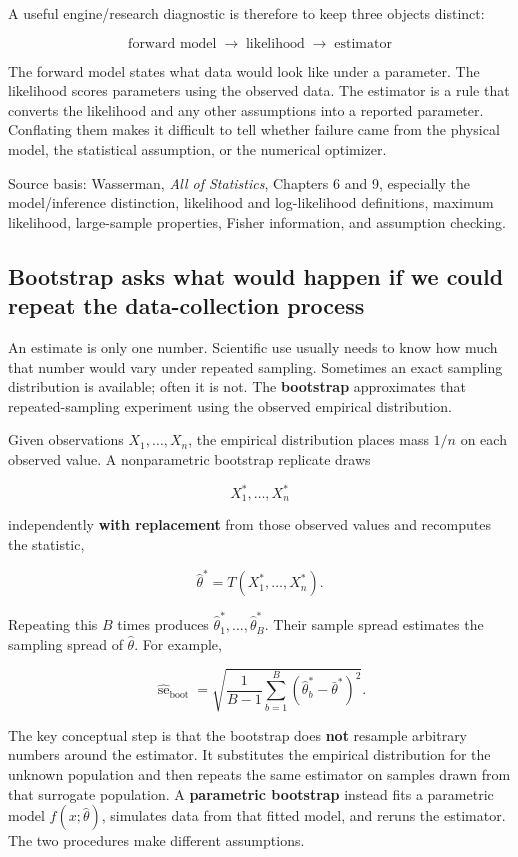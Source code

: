 A useful engine/research diagnostic is therefore to keep three objects distinct:

\[
\boxed{
\text{forward model}
\;\longrightarrow\;
\text{likelihood}
\;\longrightarrow\;
\text{estimator}
}
\]

The forward model states what data would look like under a parameter. The likelihood scores parameters using the observed data. The estimator is a rule that converts the likelihood and any other assumptions into a reported parameter. Conflating them makes it difficult to tell whether failure came from the physical model, the statistical assumption, or the numerical optimizer.

Source basis: Wasserman, \emph{All of Statistics}, Chapters 6 and 9, especially the model/inference distinction, likelihood and log-likelihood definitions, maximum likelihood, large-sample properties, Fisher information, and assumption checking.

\subsection{Bootstrap asks what would happen if we could repeat the data-collection process}\label{02-foundations-ii-ch030-bootstrap-asks-what-would-happen-if-we-could-repeat-the-data-collection-process}

An estimate is only one number. Scientific use usually needs to know how much that number would vary under repeated sampling. Sometimes an exact sampling distribution is available; often it is not. The \textbf{bootstrap} approximates that repeated-sampling experiment using the observed empirical distribution.

Given observations \(X_1,\ldots,X_n\), the empirical distribution places mass \(1/n\) on each observed value. A nonparametric bootstrap replicate draws

\[
X_1^*,\ldots,X_n^*
\]

independently \textbf{with replacement} from those observed values and recomputes the statistic,

\[
\hat\theta^*=T(X_1^*,\ldots,X_n^*).
\]

Repeating this \(B\) times produces \(\hat\theta_1^*,\ldots,\hat\theta_B^*\). Their sample spread estimates the sampling spread of \(\hat\theta\). For example,

\[
\widehat{\operatorname{se}}_{\mathrm{boot}}
=
\sqrt{
\frac{1}{B-1}
\sum_{b=1}^{B}
(\hat\theta_b^*-\bar{\theta}^*)^2
}.
\]

The key conceptual step is that the bootstrap does \textbf{not} resample arbitrary numbers around the estimator. It substitutes the empirical distribution for the unknown population and then repeats the same estimator on samples drawn from that surrogate population. A \textbf{parametric bootstrap} instead fits a parametric model \(f(x;\hat\theta)\), simulates data from that fitted model, and reruns the estimator. The two procedures make different assumptions.

